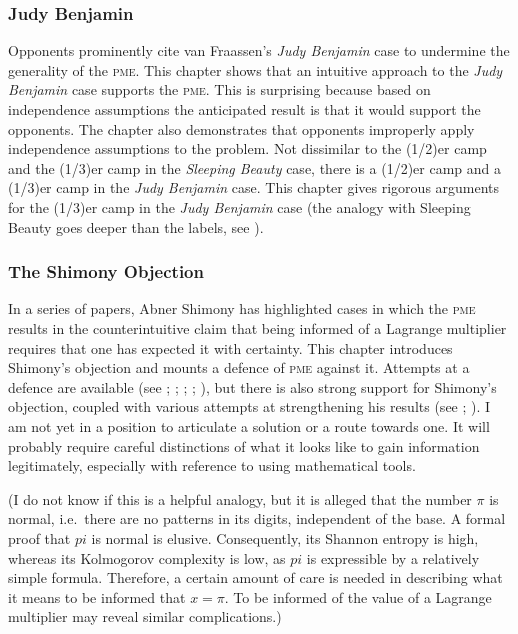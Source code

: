 \documentclass[11pt]{article}
\begin{document}
\subsubsection{Judy Benjamin}
\label{JudyBenjamin}

Opponents prominently cite van Fraassen's \emph{Judy Benjamin} case to
undermine the generality of the \textsc{pme}. This chapter shows that
an intuitive approach to the \emph{Judy Benjamin} case supports the
\textsc{pme}. This is surprising because based on independence
assumptions the anticipated result is that it would support the
opponents. The chapter also demonstrates that opponents improperly
apply independence assumptions to the problem. Not dissimilar to the
(1/2)er camp and the (1/3)er camp in the \emph{Sleeping Beauty} case,
there is a (1/2)er camp and a (1/3)er camp in the \emph{Judy Benjamin}
case. This chapter gives rigorous arguments for the (1/3)er camp in
the \emph{Judy Benjamin} case (the analogy with Sleeping Beauty goes
deeper than the labels, see ).

\subsubsection{The Shimony Objection}
\label{TheShimonyObjection}

In a series of papers, Abner Shimony has highlighted cases in which
the \textsc{pme} results in the counterintuitive claim that being
informed of a Lagrange multiplier requires that one has expected it
with certainty. This chapter introduces Shimony's objection and mounts
a defence of \textsc{pme} against it. Attempts at a defence are
available (see ; ;
; ;
), but there is also strong support for Shimony's
objection, coupled with various attempts at strengthening his results
(see ; ). I am not yet
in a position to articulate a solution or a route towards one. It will
probably require careful distinctions of what it looks like to gain
information legitimately, especially with reference to using
mathematical tools. 

(I do not know if this is a helpful analogy, but it is alleged that
the number $\pi$ is normal, i.e.\ there are no patterns in its digits,
independent of the base. A formal proof that $pi$ is normal is
elusive. Consequently, its Shannon entropy is high, whereas its
Kolmogorov complexity is low, as $pi$ is expressible by a relatively
simple formula. Therefore, a certain amount of care is needed in
describing what it means to be informed that $x=\pi$. To be informed
of the value of a Lagrange multiplier may reveal similar
complications.)
\end{document}
